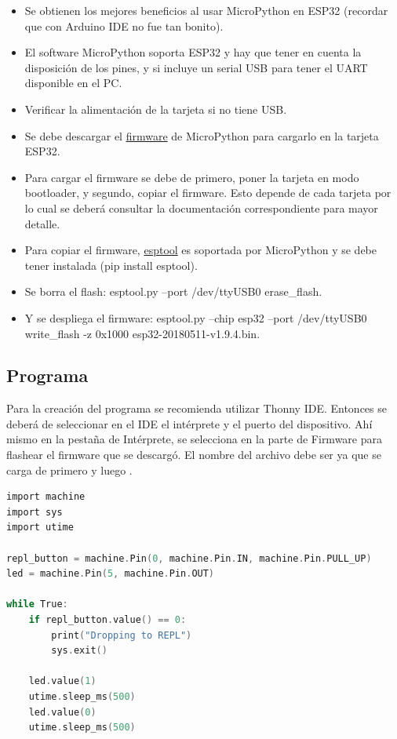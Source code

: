\documentclass[conference]{IEEEtran}
\begin{document}
\begin{itemize}
\item Se obtienen los mejores beneficios al usar MicroPython en ESP32
(recordar que con Arduino IDE no fue tan bonito).

\item El software MicroPython soporta ESP32 y hay que tener en cuenta la
disposición de los pines, y si incluye un serial USB para tener el UART
disponible en el PC.

\item Verificar la alimentación de la tarjeta si no tiene USB.

\item Se debe descargar el \href{https://micropython.org/download/#esp32}{firmware}
de MicroPython para cargarlo en la tarjeta ESP32.

\item Para cargar el firmware se debe de primero, poner la tarjeta en modo
bootloader, y segundo, copiar el firmware. Esto depende de cada tarjeta por
lo cual se deberá consultar la documentación correspondiente para mayor detalle.

\item Para copiar el firmware, \href{https://github.com/espressif/esptool}{esptool}
es soportada por MicroPython y se debe tener instalada (pip install esptool).

\item Se borra el flash: esptool.py --port /dev/ttyUSB0 erase\_flash.

\item Y se despliega el firmware: esptool.py --chip esp32 --port /dev/ttyUSB0
write\_flash -z 0x1000 esp32-20180511-v1.9.4.bin.
\end{itemize}

\subsection{Programa}

Para la creación del programa se recomienda utilizar Thonny IDE. Entonces se
deberá de seleccionar en el IDE el intérprete y el puerto del dispositivo.
Ahí mismo en la pestaña de Intérprete, se selecciona en la parte de Firmware
para flashear el firmware que se descargó. El nombre del archivo debe ser
 ya que se carga  de primero y luego .

\bigbreak

\begin{lstlisting}[language=C, caption={Programa que hace parpadear un LED
hasta que se presiona el botón de salir en MicroPython. Fuente: Sparkfun
Electronics \cite{hymel}.}]
import machine
import sys
import utime

repl_button = machine.Pin(0, machine.Pin.IN, machine.Pin.PULL_UP)
led = machine.Pin(5, machine.Pin.OUT)

while True:
    if repl_button.value() == 0:
        print("Dropping to REPL")
        sys.exit()

    led.value(1)
    utime.sleep_ms(500)
    led.value(0)
    utime.sleep_ms(500)
\end{lstlisting}
\end{document}
